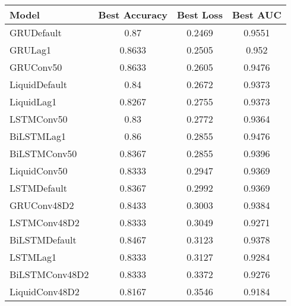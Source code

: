 \begin{table}
\centering
\begin{tabular}{lccc}
\toprule
Model & Best Accuracy & Best Loss & Best AUC \\
\midrule
GRUDefault & 0.87 & 0.2469 & 0.9551 \\
GRULag1 & 0.8633 & 0.2505 & 0.952 \\
GRUConv50 & 0.8633 & 0.2605 & 0.9476 \\
LiquidDefault & 0.84 & 0.2672 & 0.9373 \\
LiquidLag1 & 0.8267 & 0.2755 & 0.9373 \\
LSTMConv50 & 0.83 & 0.2772 & 0.9364 \\
BiLSTMLag1 & 0.86 & 0.2855 & 0.9476 \\
BiLSTMConv50 & 0.8367 & 0.2855 & 0.9396 \\
LiquidConv50 & 0.8333 & 0.2947 & 0.9369 \\
LSTMDefault & 0.8367 & 0.2992 & 0.9369 \\
GRUConv48D2 & 0.8433 & 0.3003 & 0.9384 \\
LSTMConv48D2 & 0.8333 & 0.3049 & 0.9271 \\
BiLSTMDefault & 0.8467 & 0.3123 & 0.9378 \\
LSTMLag1 & 0.8333 & 0.3127 & 0.9284 \\
BiLSTMConv48D2 & 0.8333 & 0.3372 & 0.9276 \\
LiquidConv48D2 & 0.8167 & 0.3546 & 0.9184 \\
\bottomrule
\end{tabular}
\end{table}